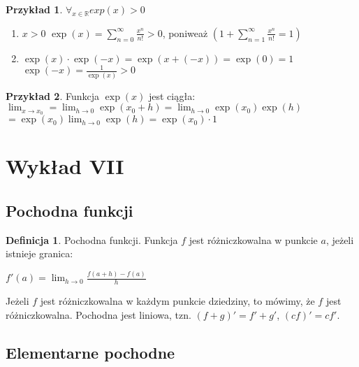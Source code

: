 \documentclass{article}
\theoremstyle{definition}
\newtheorem{de}{Definicja}[subsection]
\theoremstyle{definition}
\theoremstyle{definition}
\newtheorem{pk}{Przykład}[subsection]
\theoremstyle{definition}
\begin{document}
\begin{pk}
    $\forall_{x\in\mathbb{R}}  exp(x) > 0$
    \begin{enumerate}
        \item $x>0$ $\exp(x)=\sum_{n=0}^{\infty} \frac{x^n}{n!} > 0$, poniweaż  $(1+\sum_{n=1}^{\infty} \frac{x^n}{n!}=1)$
        \item $\exp(x)\cdot \exp(-x) = \exp(x+(-x)) = \exp(0) = 1$\\
        $\exp(-x) =\frac{1}{\exp(x)} > 0$
    \end{enumerate}
\end{pk}

\begin{pk}
    Funkcja $\exp(x)$ jest ciągła:\\
    $\lim_{x\rightarrow x_0}=\lim_{h\rightarrow 0} \exp(x_0+h) = \lim_{h\rightarrow 0} \exp(x_0)\exp(h)$\\
    $= \exp(x_0)\lim_{h\rightarrow 0} \exp(h) = \exp(x_0) \cdot 1$
\end{pk}

\section{Wykład VII}

\subsection{Pochodna funkcji}

\begin{de}
    Pochodna funkcji. Funkcja $f$ jest różniczkowalna w punkcie $a$, jeżeli istnieje granica:
    \begin{center}
        $f'(a)=\lim_{h\rightarrow 0} \frac{f(a+h)-f(a)}{h}$
    \end{center}
    Jeżeli $f$ jest różniczkowalna w każdym punkcie dziedziny, to mówimy, że $f$ jest różniczkowalna.
    Pochodna jest liniowa, tzn. $(f+g)'=f'+g'$, $(cf)'=cf'$.
\end{de}

\subsection{Elementarne pochodne}
\end{document}
